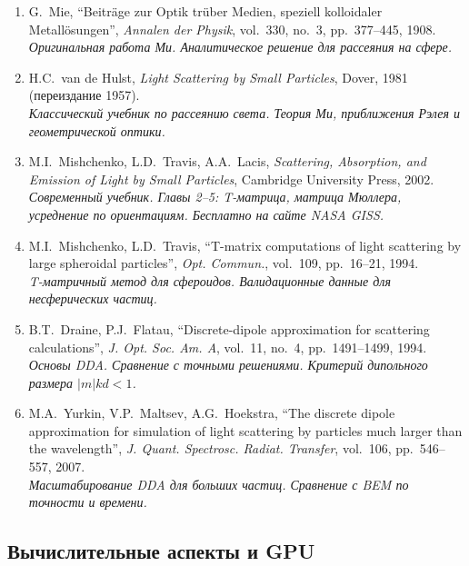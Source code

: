 \documentclass[12pt,a4paper]{article}
\begin{document}
\begin{enumerate}[resume]
  \item G.~Mie, ``Beitr{\"a}ge zur Optik tr{\"u}ber Medien, speziell kolloidaler Metall{\"o}sungen'', \textit{Annalen der Physik}, vol.~330, no.~3, pp.~377--445, 1908.
  \\ \textit{Оригинальная работа Ми. Аналитическое решение для рассеяния на сфере.}

  \item H.C.~van de Hulst, \textit{Light Scattering by Small Particles}, Dover, 1981 (переиздание 1957).
  \\ \textit{Классический учебник по рассеянию света. Теория Ми, приближения Рэлея и геометрической оптики.}

  \item M.I.~Mishchenko, L.D.~Travis, A.A.~Lacis, \textit{Scattering, Absorption, and Emission of Light by Small Particles}, Cambridge University Press, 2002.
  \\ \textit{Современный учебник. Главы 2--5: T-матрица, матрица Мюллера, усреднение по ориентациям. Бесплатно на сайте NASA GISS.}

  \item M.I.~Mishchenko, L.D.~Travis, ``T-matrix computations of light scattering by large spheroidal particles'', \textit{Opt. Commun.}, vol.~109, pp.~16--21, 1994.
  \\ \textit{T-матричный метод для сфероидов. Валидационные данные для несферических частиц.}

  \item B.T.~Draine, P.J.~Flatau, ``Discrete-dipole approximation for scattering calculations'', \textit{J. Opt. Soc. Am. A}, vol.~11, no.~4, pp.~1491--1499, 1994.
  \\ \textit{Основы DDA. Сравнение с точными решениями. Критерий дипольного размера $|m|kd < 1$.}

  \item M.A.~Yurkin, V.P.~Maltsev, A.G.~Hoekstra, ``The discrete dipole approximation for simulation of light scattering by particles much larger than the wavelength'', \textit{J. Quant. Spectrosc. Radiat. Transfer}, vol.~106, pp.~546--557, 2007.
  \\ \textit{Масштабирование DDA для больших частиц. Сравнение с BEM по точности и времени.}
\end{enumerate}

\subsection{Вычислительные аспекты и GPU}
\end{document}
